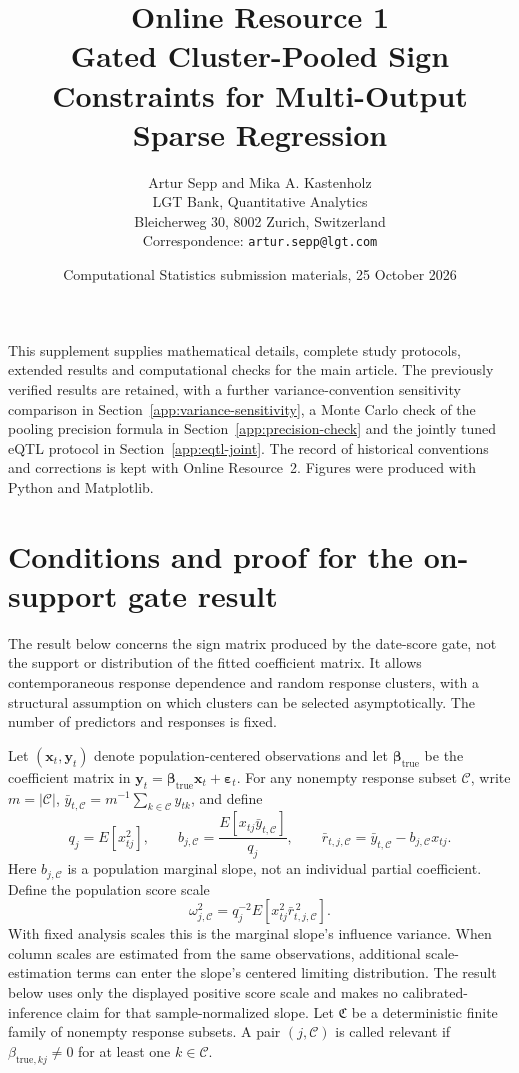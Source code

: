 \documentclass[11pt,a4paper]{article}
\title{Online Resource 1\\[0.5em]\large Gated Cluster-Pooled Sign Constraints for Multi-Output Sparse Regression}
\author{Artur Sepp and Mika A. Kastenholz\\\small LGT Bank, Quantitative Analytics\\\small Bleicherweg 30, 8002 Zurich, Switzerland\\\small Correspondence: \texttt{artur.sepp@lgt.com}}
\date{Computational Statistics submission materials, 25 October 2026}
\begin{document}
\maketitle
This supplement supplies mathematical details, complete study protocols,
extended results and computational checks for the main article. The previously
verified results are retained, with a further variance-convention sensitivity
comparison in Section~\ref{app:variance-sensitivity}, a Monte Carlo check of
the pooling precision formula in Section~\ref{app:precision-check} and the jointly
tuned eQTL protocol in Section~\ref{app:eqtl-joint}. The record of
historical conventions and corrections is kept with Online Resource~2.
Figures were produced with Python and Matplotlib.
\tableofcontents
\clearpage
\section{Conditions and proof for the on-support gate result} \label{app:theory}

The result below concerns the sign matrix produced by the date-score gate, not
the support or distribution of the fitted coefficient matrix. It allows
contemporaneous response dependence and random response clusters, with a
structural assumption on which clusters can be selected asymptotically. The
number of predictors and responses is fixed.

Let $(\bm x_t,\bm y_t)$ denote population-centered observations and let
$\bm\beta_{\mathrm{true}}$ be the coefficient matrix in
$\bm y_t=\bm\beta_{\mathrm{true}}\bm x_t+\bm\varepsilon_t$.
For any nonempty response subset $\mathcal C$, write
$m=|\mathcal C|$, $\bar y_{t,\mathcal C}=m^{-1}\sum_{k\in\mathcal C}y_{tk}$,
and define
\begin{equation}\label{eq:population-pooled-slope}
 q_j=E[x_{tj}^2],\qquad
 b_{j,\mathcal C}=\frac{E[x_{tj}\bar y_{t,\mathcal C}]}{q_j},\qquad
 \bar r_{t,j,\mathcal C}=\bar y_{t,\mathcal C}-b_{j,\mathcal C}x_{tj}.
\end{equation}
Here $b_{j,\mathcal C}$ is a population marginal slope, not an individual
partial coefficient. Define the population score scale
\begin{equation}\label{eq:gate-influence-variance}
 \omega_{j,\mathcal C}^2
 =q_j^{-2}E[x_{tj}^2\bar r_{t,j,\mathcal C}^{\,2}].
\end{equation}
With fixed analysis scales this is the marginal slope's influence variance.
When column scales are estimated from the same observations, additional
scale-estimation terms can enter the slope's centered limiting distribution.
The result below uses only the displayed positive score scale and makes no
calibrated-inference claim for that sample-normalized slope.
Let $\mathfrak C$ be a deterministic finite family of nonempty response
subsets. A pair $(j,\mathcal C)$ is called relevant if
$\beta_{\mathrm{true},kj}\ne0$ for at least one $k\in\mathcal C$.
\end{document}
